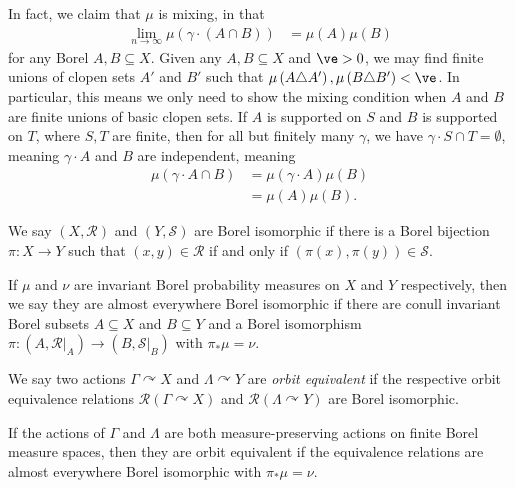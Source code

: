 \documentclass[10pt]{mypackage}
\begin{document}
In fact, we claim that $\mu$ is mixing, in that
\begin{align*}
  \lim_{n\rightarrow\infty} \mu\left( \gamma\cdot \left( A\cap B \right) \right) &= \mu\left( A \right)\mu\left( B \right)
\end{align*}
for any Borel $A,B\subseteq X$. Given any $A,B\subseteq X$ and $\ve > 0$, we may find finite unions of clopen sets $A'$ and $B'$ such that $\mu\left( A\triangle A' \right),\mu\left( B\triangle B' \right) < \ve$. In particular, this means we only need to show the mixing condition when $A$ and $B$ are finite unions of basic clopen sets. If $A$ is supported on $S$ and $B$ is supported on $T$, where $S,T$ are finite, then for all but finitely many $\gamma$, we have $\gamma\cdot S\cap T = \emptyset$, meaning $\gamma\cdot A$ and $B$ are independent, meaning
\begin{align*}
  \mu\left( \gamma\cdot A\cap B \right) &= \mu\left( \gamma\cdot A \right)\mu\left( B \right)\\
                                        &= \mu\left( A \right)\mu\left( B \right).
\end{align*}
\begin{definition}
  We say $\left( X,\mathcal{R} \right)$ and $\left( Y,\mathcal{S} \right)$ are Borel isomorphic if there is a Borel bijection $\pi\colon X\rightarrow Y$ such that $\left( x,y \right)\in \mathcal{R}$ if and only if $\left( \pi(x),\pi(y) \right)\in \mathcal{S}$.

  If $\mu$ and $\nu$ are invariant Borel probability measures on $X$ and $Y$ respectively, then we say they are almost everywhere Borel isomorphic if there are conull invariant Borel subsets $A\subseteq X$ and $B\subseteq Y$ and a Borel isomorphism $\pi\colon \left( A,\mathcal{R}|_{A} \right) \rightarrow \left( B,\mathcal{S}|_{B} \right)$ with $\pi_{\ast}\mu=\nu$.
\end{definition}
\begin{definition}
  We say two actions $\Gamma\curvearrowright X$ and $\Lambda\curvearrowright Y$ are \textit{orbit equivalent} if the respective orbit equivalence relations $ \mathcal{R}\left( \Gamma\curvearrowright X \right) $ and $\mathcal{R}\left( \Lambda\curvearrowright Y \right)$ are Borel isomorphic.

  If the actions of $\Gamma$ and $\Lambda$ are both measure-preserving actions on finite Borel measure spaces, then they are orbit equivalent if the equivalence relations are almost everywhere Borel isomorphic with $\pi_{\ast}\mu = \nu$.
\end{definition}
\end{document}
